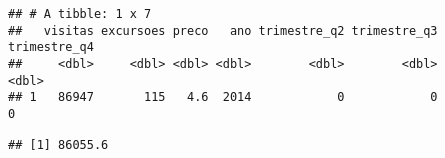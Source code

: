 \documentclass[
]{article}
\newenvironment{Shaded}{\begin{snugshade}}{\end{snugshade}}
\newcommand{\FloatTok}[1]{\textcolor[rgb]{0.00,0.00,0.81}{#1}}
\newcommand{\NormalTok}[1]{#1}
\newcommand{\OtherTok}[1]{\textcolor[rgb]{0.56,0.35,0.01}{#1}}
\newcommand{\SpecialCharTok}[1]{\textcolor[rgb]{0.00,0.00,0.00}{#1}}
\begin{document}
\begin{verbatim}
## # A tibble: 1 x 7
##   visitas excursoes preco   ano trimestre_q2 trimestre_q3 trimestre_q4
##     <dbl>     <dbl> <dbl> <dbl>        <dbl>        <dbl>        <dbl>
## 1   86947       115   4.6  2014            0            0            0
\end{verbatim}

\begin{Shaded}
\end{Shaded}

\begin{verbatim}
## [1] 86055.6
\end{verbatim}
\end{document}
